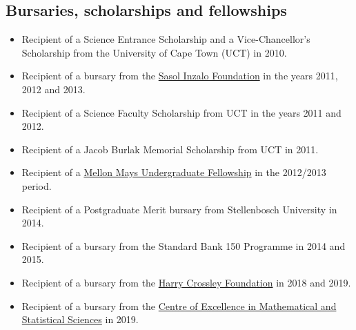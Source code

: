 \documentclass{article}
\begin{document}
\subsection{Bursaries, scholarships and fellowships}
\begin{itemize}
	\item Recipient of a Science Entrance Scholarship and a Vice-Chancellor's Scholarship from the University of Cape Town (UCT) in 2010.
	\item Recipient of a bursary from the \href{http://www.sasolinzalofoundation.org.za/}{Sasol Inzalo Foundation} in the years 2011, 2012 and 2013.
	\item Recipient of a Science Faculty Scholarship from UCT in the years 2011 and 2012.
	\item Recipient of a Jacob Burlak Memorial Scholarship from UCT in 2011.
	\item Recipient of a \href{http://www.mmuf.org/}{Mellon Mays Undergraduate Fellowship} in the 2012/2013 period.
	\item Recipient of a Postgraduate Merit bursary from Stellenbosch University in 2014.
	\item Recipient of a bursary from the Standard Bank 150 Programme in 2014 and 2015.
	\item Recipient of a bursary from the \href{http://thecrossleyfoundation.co.za/}{Harry Crossley Foundation} in 2018 and 2019.
	\item Recipient of a bursary from the \href{https://www.wits.ac.za/coe-mass/}{Centre of Excellence in Mathematical and Statistical Sciences} in 2019.
\end{itemize}
\end{document}
